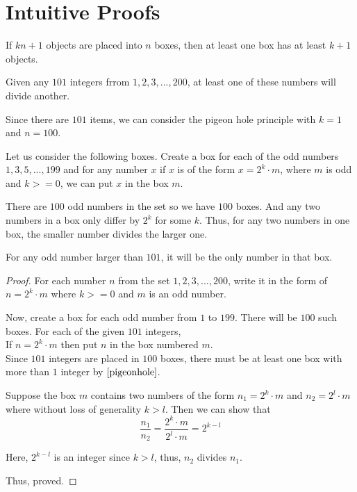 \chapter{Intuitive Proofs}


\begin{principle}
  \label{pigeonhole}
If $kn+1$ objects are placed into $n$ boxes,
then at least one box has at least $k+1$ objects.
\end{principle}

\begin{example} Given any $101$ integers frrom ${1, 2, 3, ..., 200}$, at least
one of these numbers will divide another.
\end{example}

\begin{scratch}
Since there are $101$ items, we can consider the pigeon hole principle with $k=1$ and $n=100$.

Let us consider the following boxes. Create a box for each of the odd numbers ${1, 3, 5, ..., 199}$ and for any number $x$ if $x$ is of the form $x = 2^k \cdot m$, where $m$ is odd and $k >= 0$, we can put $x$ in the box $m$.

There are $100$ odd numbers in the set so we have $100$ boxes. And any two numbers in a box only differ by $2^k$ for some $k$. Thus, for any two numbers in one box, the smaller number divides the larger one.

For any odd number larger than $101$, it will be the only number in that box.
\end{scratch}

\begin{proof}
  For each number $n$ from the set ${1, 2, 3, ..., 200}$, write it in the form of $n = 2^k \cdot m$ where $k >= 0$ and $m$ is an odd number.

  Now, create a box for each odd number from $1$ to $199$. There will be $100$ such boxes. For each of the given $101$ integers, \\

  If $n = 2^k \cdot m$ then put $n$ in the box numbered $m$. \\

  Since $101$ integers are placed in $100$ boxes, there must be at least one box with more than $1$ integer by $\ref{pigeonhole}$.

  Suppose the box $m$ contains two numbers of the form $n_1 = 2^k \cdot m$ and $n_2 = 2^l \cdot m$ where without loss of generality $k > l$. Then we can show that
  $$\frac{n_1}{n_2} = \frac{2^k \cdot m}{2^l \cdot m} = 2^{k-l}$$

  Here, $2^{k-l}$ is an integer since $k > l$, thus, $n_2$ divides $n_1$.

  Thus, proved.
\end{proof}




